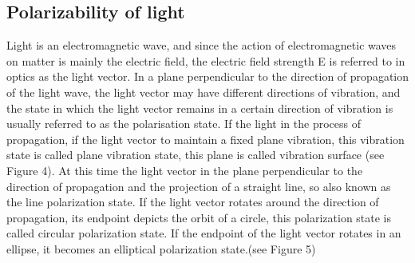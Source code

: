 \documentclass[UTF8]{article}
\begin{document}
	\subsection{Polarizability of light}
	Light is an electromagnetic wave, and since the action of electromagnetic waves on matter is mainly the electric field, the electric field strength E is referred to in optics as the light vector. In a plane perpendicular to the direction of propagation of the light wave, the light vector may have different directions of vibration, and the state in which the light vector remains in a certain direction of vibration is usually referred to as the polarisation state. If the light in the process of propagation, if the light vector to maintain a fixed plane vibration, this vibration state is called plane vibration state, this plane is called vibration surface (see Figure 4). At this time the light vector in the plane perpendicular to the direction of propagation and the projection of a straight line, so also known as the line polarization state. If the light vector rotates around the direction of propagation, its endpoint depicts the orbit of a circle, this polarization state is called circular polarization state. If the endpoint of the light vector rotates in an ellipse, it becomes an elliptical polarization state.(see Figure 5)
\end{document}
